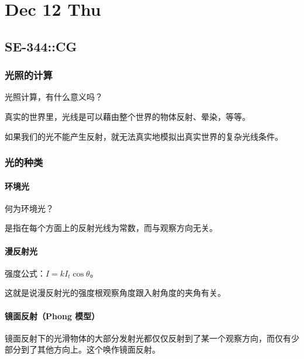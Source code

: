 \documentclass[
]{article}
\date{}
\begin{document}
\hypertarget{header-n0}{%
\section{Dec 12 Thu}\label{header-n0}}

\hypertarget{header-n2}{%
\subsection{SE-344::CG}\label{header-n2}}

\hypertarget{header-n3}{%
\subsubsection{光照的计算}\label{header-n3}}

光照计算，有什么意义吗？

真实的世界里，光线是可以藉由整个世界的物体反射、晕染，等等。

如果我们的光不能产生反射，就无法真实地模拟出真实世界的复杂光线条件。

\hypertarget{header-n7}{%
\subsubsection{光的种类}\label{header-n7}}

\hypertarget{header-n8}{%
\paragraph{环境光}\label{header-n8}}

何为环境光？

是指在每个方面上的反射光线为常数，而与观察方向无关。

\hypertarget{header-n11}{%
\paragraph{漫反射光}\label{header-n11}}

强度公式：\(I = kI_t\cos \theta\)。

这就是说漫反射光的强度根观察角度跟入射角度的夹角有关。

\hypertarget{header-n14}{%
\paragraph{镜面反射（Phong 模型）}\label{header-n14}}

镜面反射下的光滑物体的大部分发射光都仅仅反射到了某一个观察方向，而仅有少部分到了其他方向上。这个唤作镜面反射。
\end{document}
